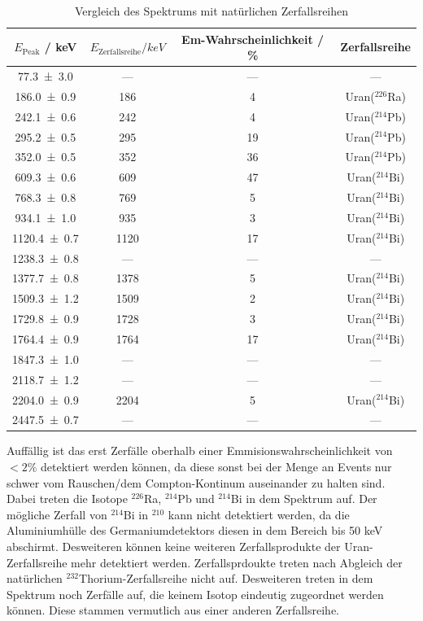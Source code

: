 \begin{table}[H]
  \centering
  \caption{Vergleich des Spektrums mit natürlichen Zerfallsreihen}
  \begin{tabular}{c c c c}
    \toprule
    $E_\text{Peak}$ / keV & $E_\text{Zerfallsreihe} /keV$ & Em-Wahrscheinlichkeit / \% & Zerfallsreihe \\
    \midrule
    \num{77.3+-3.0}	& ---	& ---	& ---	\\
    \num{186.0+-0.9}	& 186	& 4	&Uran($^{226}$Ra)	\\
    \num{242.1+-0.6}	& 242	& 4	&Uran($^{214}$Pb)	\\
    \num{295.2+-0.5}	& 295	& 19	&Uran($^{214}$Pb)	\\
    \num{352.0+-0.5}	& 352	& 36	&Uran($^{214}$Pb)	\\
    \num{609.3+-0.6}	& 609	& 47	&Uran($^{214}$Bi)	\\
    \num{768.3+-0.8}	& 769	& 5	&Uran($^{214}$Bi)	\\
    \num{934.1+-1.0}	& 935	& 3	&Uran($^{214}$Bi)	\\
    \num{1120.4+-0.7}	& 1120	& 17	&Uran($^{214}$Bi)	\\
    \num{1238.3+-0.8}	& ---	& ---	& ---	\\
    \num{1377.7+-0.8}	& 1378	& 5	&Uran($^{214}$Bi)	\\
    \num{1509.3+-1.2}	& 1509	& 2	&Uran($^{214}$Bi)	\\
    \num{1729.8+-0.9}	& 1728	& 3	&Uran($^{214}$Bi)	\\
    \num{1764.4+-0.9}	& 1764	& 17	&Uran($^{214}$Bi)	\\
    \num{1847.3+-1.0}	& ---	& ---	& ---	\\
    \num{2118.7+-1.2}	& ---	& ---	& ---	\\
    \num{2204.0+-0.9}	& 2204	& 5  	&Uran($^{214}$Bi)	\\
    \num{2447.5+-0.7}	& ---	& ---	& ---	\\
  \end{tabular}
  \label{tab:Stone}
\end{table}
Auffällig ist das erst Zerfälle oberhalb einer Emmisionswahrscheinlichkeit von $<2\%$ detektiert werden können, da diese sonst bei der Menge an Events nur schwer vom Rauschen/dem Compton-Kontinum auseinander zu halten sind. Dabei treten die Isotope $^{226}$Ra, $^{214}$Pb und $^{214}$Bi in dem Spektrum auf. Der mögliche Zerfall von $^{214}$Bi in $^{210}$ kann nicht detektiert werden, da die Aluminiumhülle des Germaniumdetektors diesen in dem Bereich bis 50 keV abschirmt. Desweiteren können keine weiteren Zerfallsprodukte der Uran-Zerfallsreihe mehr detektiert werden. Zerfallsprdoukte treten nach Abgleich der natürlichen $^{232}$Thorium-Zerfallsreihe \cite{V18} nicht auf. 
Desweiteren treten in dem Spektrum noch Zerfälle auf, die keinem Isotop eindeutig zugeordnet werden können. Diese stammen vermutlich aus einer anderen Zerfallsreihe. 
